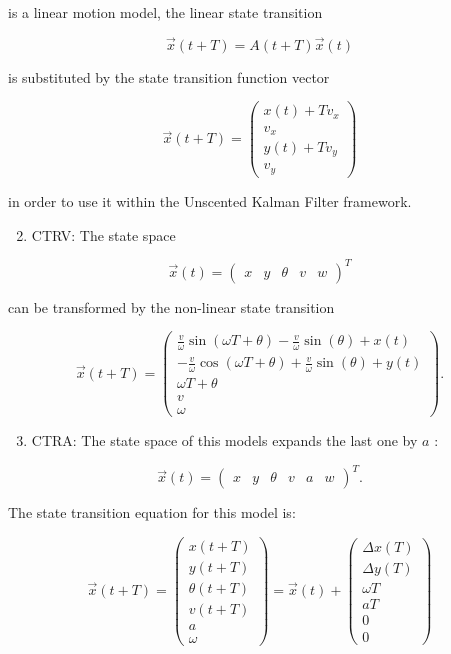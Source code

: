 is a linear motion model, the linear state transition

$$
\vec{x}(t+T)=A(t+T) \vec{x}(t)
$$

is substituted by the state transition function vector

$$
\vec{x}(t+T)=\left(\begin{array}{c}
	x(t)+T v_{x} \\
	v_{x} \\
	y(t)+T v_{y} \\
	v_{y}
\end{array}\right)
$$

in order to use it within the Unscented Kalman Filter framework.

\begin{enumerate}
	\setcounter{enumi}{1}
	\item CTRV: The state space
\end{enumerate}

$$
\vec{x}(t)=\left(\begin{array}{ccccc}
	x & y & \theta & v & w
\end{array}\right)^{T}
$$

can be transformed by the non-linear state transition

$$
\vec{x}(t+T)=\left(\begin{array}{c}
	\frac{v}{\omega} \sin (\omega T+\theta)-\frac{v}{\omega} \sin (\theta)+x(t) \\
	-\frac{v}{\omega} \cos (\omega T+\theta)+\frac{v}{\omega} \sin (\theta)+y(t) \\
	\omega T+\theta \\
	v \\
	\omega
\end{array}\right) .
$$

\begin{enumerate}
	\setcounter{enumi}{2}
	\item CTRA: The state space of this models expands the last one by $a$ :
\end{enumerate}

$$
\vec{x}(t)=\left(\begin{array}{llllll}
	x & y & \theta & v & a & w
\end{array}\right)^{T} .
$$

The state transition equation for this model is:

$$
\vec{x}(t+T)=\left(\begin{array}{c}
	x(t+T) \\
	y(t+T) \\
	\theta(t+T) \\
	v(t+T) \\
	a \\
	\omega
\end{array}\right)=\vec{x}(t)+\left(\begin{array}{c}
	\Delta x(T) \\
	\Delta y(T) \\
	\omega T \\
	a T \\
	0 \\
	0
\end{array}\right)
$$

